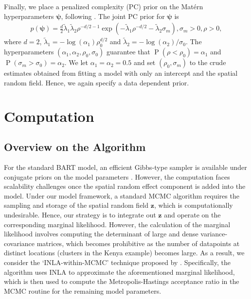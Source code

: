 \documentclass[preprint,12pt,authoryear]{elsarticle}
\begin{document}
Finally, we place a penalized complexity (PC) prior on the Mat\'ern hyperparameters $\boldsymbol{\psi}$, following \cite{Fuglstad19}. The joint PC prior for $\boldsymbol{\psi}$ is 
\begin{align*}
	p(\boldsymbol{\psi}) = \frac{d}{2}\tilde{\lambda}_1\tilde{\lambda}_2\rho^{-d/2 - 1} \exp \left(-\tilde{\lambda}_1 \rho^{-d/2} - \tilde{\lambda}_2 \sigma_m \right), \sigma_m >0, \rho > 0,
\end{align*}
where $d=2$, $\tilde{\lambda}_1 = -\log(\alpha_1)\rho_0^{d/2}$ and $\tilde{\lambda}_2 = -{\log (\alpha_2)}/{\sigma_0}$. The hyperparameters $(\alpha_1, \alpha_2, \rho_0, \sigma_0)$ guarantee that 
$\operatorname{P}(\rho < \rho_0) = \alpha_1$ and $\operatorname{P}(\sigma_m > \sigma_0) = \alpha_2$. We let $\alpha_1 = \alpha_2 = 0.5$ and set $(\rho_0, \sigma_m)$ to the crude estimates obtained from fitting a model with only an intercept and the spatial random field. Hence, we again specify a data dependent prior. 

{
\section{Computation}
\label{sec:comp}

\subsection{Overview on the Algorithm}
}
{For the standard BART model, an efficient Gibbs-type sampler is available under conjugate priors on the model parameters \citep{chipman1998bayesian}. However, the computation faces scalability challenges once the spatial random effect component is added into the model.} Under our model framework, a standard MCMC algorithm requires the sampling and storage of the spatial random field $\boldsymbol{z}$, which is computationally undesirable. Hence, our strategy is to integrate out $\boldsymbol{z}$ and operate on the corresponding marginal likelihood. However, the calculation of the marginal likelihood involves computing the determinant of large and dense variance-covariance matrices, which becomes prohibitive as the number of datapoints at distinct locations (clusters in the Kenya example) becomes large. As a result, we consider the `INLA-within-MCMC' technique proposed by \cite{gomez2018markov}. Specifically, the algorithm uses INLA to approximate the aforementioned marginal likelihood, which is then used to compute the Metropolis-Hastings acceptance ratio in the MCMC routine for the remaining model parameters. %
\end{document}
